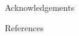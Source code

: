 \documentclass[final]{beamer}
\newlength{\sepwidth}
\newlength{\colwidth}
\newcommand{\separatorcolumn}{\begin{column}{\sepwidth}\end{column}}
\begin{document}
\begin{frame}[t]
\begin{columns}[t]
\begin{column}{\colwidth}
\begin{block}{Acknowledgements}
      \end{block}

      \begin{block}{References}

        \nocite{*}
        \footnotesize{}

      \end{block}

    \end{column}

    \separatorcolumn
  \end{columns}
\end{frame}
\end{document}
